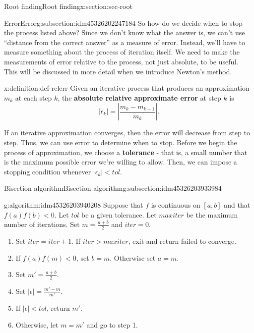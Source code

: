 \documentclass[oneside,10pt,]{article}
\newcommand{\terminology}[1]{\textbf{#1}}
\numberwithin{equation}{section}
\newcommand{\abs}[1]{\left\vert#1\right\vert}
\numberwithin{equation}{section}
\newcommand{\lt}{<}
\newcommand{\gt}{>}
\begin{document}
\begin{sectionptx}{Root finding}{}{Root finding}{}{}{x:section:sec-root}
\begin{subsectionptx}{Error}{}{Error}{}{}{g:subsection:idm45326202247184}
So how do we decide when to stop the process listed above? Since we don't know what the answer is, we can't use ``distance from the correct answer'' as a measure of error. Instead, we'll have to measure something about the process of iteration itself. We need to make the measurements of error relative to the process, not just absolute, to be useful. This will be discussed in more detail when we introduce Newton's method.%
\begin{definition}{}{x:definition:def-relerr}%
Given an iterative process that produces an approximation \(m_k\) at each step \(k\), the \terminology{absolute relative approximate error} at step \(k\) is%
\begin{equation*}
\abs{\epsilon_k} = \abs{\frac{m_k - m_{k-1}}{m_k}}.
\end{equation*}
%
\end{definition}
If an iterative approximation converges, then the error will decrease from step to step. Thus, we can use error to determine when to stop. Before we begin the process of approximation, we choose a \terminology{tolerance} - that is, a small number that is the maximum possible error we're willing to allow. Then, we can impose a stopping condition whenever \(\abs{\epsilon_k} \lt tol\).%
\end{subsectionptx}
%
%
\typeout{************************************************}
\typeout{************************************************}
%
\begin{subsectionptx}{Bisection algorithm}{}{Bisection algorithm}{}{}{g:subsection:idm45326203933984}
\begin{algorithm}{}{}{g:algorithm:idm45326203940208}%
Suppose that \(f\) is continuous on \([a,b]\) and that \(f(a)f(b) \lt 0\). Let \(tol\) be a given tolerance. Let \(maxiter\) be the maximum number of iterations. Set \(m = \frac{a+b}{2}\) and \(iter = 0\).%
\begin{enumerate}
\item{}Set \(iter = iter + 1\). If \(iter \gt maxiter\), exit and return failed to converge.%
\item{}If \(f(a)f(m) \lt 0\), set \(b = m\). Otherwise set \(a = m\).%
\item{}Set \(m' = \frac{a + b}{2}\).%
\item{}Set \(\abs{\epsilon} = \frac{m' - m}{m'}\).%
\item{}If \(\abs{\epsilon} \lt tol\), return \(m'\).%
\item{}Otherwise, let \(m = m'\) and go to step 1.%

\end{enumerate}
\end{algorithm}
\end{subsectionptx}
\end{sectionptx}
\end{document}
